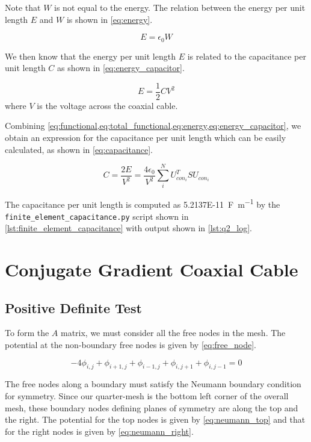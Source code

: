 \documentclass[a4paper,titlepage]{article}
\begin{document}
	Note that $W$ is not equal to the energy. The relation between the energy per unit length $E$ and $W$ is shown in \cref{eq:energy}.
	
	\begin{equation} \label{eq:energy}
		E = \epsilon_0 W
	\end{equation}
	
	We then know that the energy per unit length $E$ is related to the capacitance per unit length $C$ as shown in \cref{eq:energy_capacitor}.
	
	\begin{equation} \label{eq:energy_capacitor}
		E = \frac{1}{2} C V^2
	\end{equation}
	where $V$ is the voltage across the coaxial cable.
	
	Combining \cref{eq:functional,eq:total_functional,eq:energy,eq:energy_capacitor}, we obtain an expression for the capacitance per unit length which can be easily calculated, as shown in \autoref{eq:capacitance}.
	
	\begin{equation} \label{eq:capacitance}
		C = \frac{2E}{V^2} = \frac{4 \epsilon_0}{V^2} \sum_{i}^{N}{U_{con_i}^T S U_{con_i}}
	\end{equation}
	
	The capacitance per unit length is computed as \SI{5.2137E-11}{\farad\per\meter} by the \texttt{finite_element_capacitance.py} script shown in \cref{lst:finite_element_capacitance} with output shown in \cref{lst:q2_log}.
	
	\section{Conjugate Gradient Coaxial Cable}
	
	\subsection{Positive Definite Test}
	
	To form the $A$ matrix, we must consider all the free nodes in the mesh. The potential at the non-boundary free nodes is given by \cref{eq:free_node}.
	
	\begin{equation} \label{eq:free_node}
		-4\phi_{i, j} + \phi_{i + 1, j}  + \phi_{i - 1, j}  + \phi_{i, j + 1}  + \phi_{i, j - 1} = 0
	\end{equation}
	
	The free nodes along a boundary must satisfy the Neumann boundary condition for symmetry. Since our quarter-mesh is the bottom left corner of the overall mesh, these boundary nodes defining planes of symmetry are along the top and the right. The potential for the top nodes is given by \cref{eq:neumann_top} and that for the right nodes is given by \cref{eq:neumann_right}.
\end{document}
